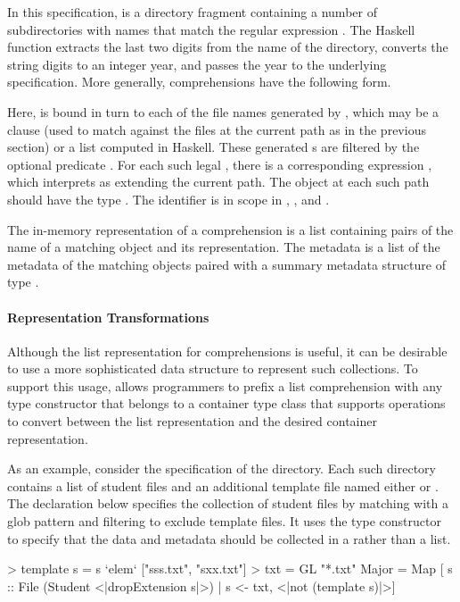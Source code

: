 In this specification,  is a directory fragment containing a number of
 subdirectories with names  that match the regular expression
.  The Haskell function  extracts the last two digits from the
name of the directory, converts the string digits to an integer year, and passes
the year to the underlying  specification.
More generally, comprehensions have the following form.
\begin{code}
\end{code}
Here,  is bound in turn to each of the file names generated by
, which may be a  clause (used to match against
the files at the current path as in the previous section) or a list
computed in Haskell.  These generated s are filtered by the
optional predicate .  For each such legal , there is a
corresponding expression , which \forest{} interprets as extending
the current path.  The object at each such path should have the \forest{}
type .  The identifier  is in scope in ,
, and .  

The in-memory representation of a comprehension is a list containing
pairs of the name of a matching object and its representation.  The
metadata is a list of the metadata of the matching objects paired with
a summary metadata structure of type .


\paragraph*{Representation Transformations}
Although the list representation for comprehensions is useful, it can
be desirable to use a more sophisticated data structure to
represent such collections.  To support
this usage, \forest{} allows programmers to prefix a list
comprehension with any type constructor that belongs to a 
container type class that supports operations to convert between the
list representation and the desired container representation. 

As an example, consider the specification of the  directory.
Each such directory contains a list of student files and an additional
template file named either  or .  The
declaration below specifies the collection of student files by
matching with a glob pattern and filtering to exclude 
template files. It uses the  type constructor to specify that
the data and metadata should be collected in a
 rather than a list.
\begin{code}
> template s = s `elem` ["sss.txt", "sxx.txt"]
> txt = GL "*.txt"
\mbox{}
 Major = Map
   [ s :: File (Student <|dropExtension s|>) 
   | s <-  txt, <|not (template s)|>]
\end{code}


